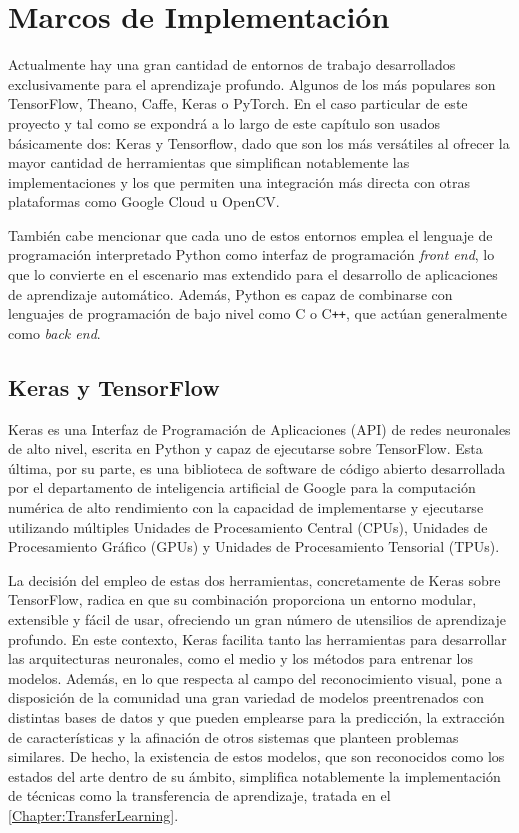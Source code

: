 \renewcommand{\tablename}{Tabla}

\chapter{Marcos de Implementación} \label{Chapter:3}

Actualmente hay una gran cantidad de entornos de trabajo desarrollados exclusivamente para el aprendizaje profundo. Algunos de los más populares son TensorFlow, Theano, Caffe, Keras o PyTorch. En el caso particular de este proyecto y tal como se expondrá a lo largo de este capítulo son usados básicamente dos: Keras y Tensorflow, dado que son los más versátiles al ofrecer la mayor cantidad de herramientas que simplifican notablemente las implementaciones y los que permiten una integración más directa con otras plataformas como Google Cloud u OpenCV.

También cabe mencionar que cada uno de estos entornos emplea el lenguaje de programación interpretado Python como interfaz de programación \textit{front end}, lo que lo convierte en el escenario mas extendido para el desarrollo de aplicaciones de aprendizaje automático. Además, Python es capaz de combinarse con lenguajes de programación de bajo nivel como C o C\texttt{++}, que actúan generalmente como \textit{back end}.

\section{Keras y TensorFlow}

Keras es una Interfaz de Programación de Aplicaciones (API) de redes neuronales de alto nivel, escrita en Python y capaz de ejecutarse sobre TensorFlow. Esta última, por su parte, es una biblioteca de software de código abierto desarrollada por el departamento de inteligencia artificial de Google para la computación numérica de alto rendimiento con la capacidad de implementarse y ejecutarse utilizando múltiples Unidades de Procesamiento Central (CPUs), Unidades de Procesamiento Gráfico (GPUs) y Unidades de Procesamiento Tensorial (TPUs).

La decisión del empleo de estas dos herramientas, concretamente de Keras sobre TensorFlow, radica en que su combinación proporciona un entorno modular, extensible y fácil de usar, ofreciendo un gran número de utensilios de aprendizaje profundo. En este contexto, Keras facilita tanto las herramientas para desarrollar las arquitecturas neuronales, como el medio y los métodos para entrenar los modelos. Además, en lo que respecta al campo del reconocimiento visual, pone a disposición de la comunidad una gran variedad de modelos preentrenados con distintas bases de datos y que pueden emplearse para la predicción, la extracción de características y la afinación de otros sistemas que planteen problemas similares. De hecho, la existencia de estos modelos, que son reconocidos como los estados del arte dentro de su ámbito, simplifica notablemente la implementación de técnicas como la transferencia de aprendizaje, tratada en el \autoref{Chapter:TransferLearning}.

